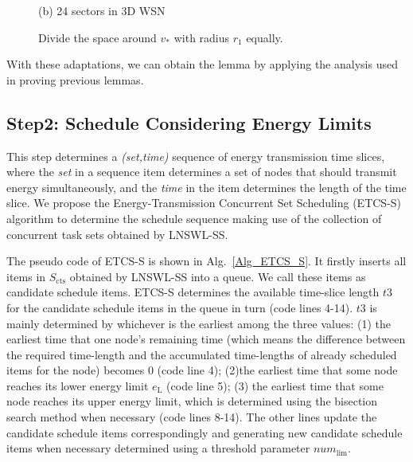 \documentclass[12pt,journal,onecolumn,draftcls]{IEEEtran}
\begin{document}
\begin{IEEEproof}
\begin{figure}[htb]
{\begin{minipage}[c]{0.22\textwidth}
\parbox{\linewidth}{\centering\small{(b) 24 sectors in 3D WSN}}
\end{minipage}
}
\caption{Divide the space around $v_{*}$ with radius $r_1$ equally.}
\label{fig_spacearound_div}
\end{figure}

With these adaptations, we can obtain the lemma by applying the analysis used in proving previous lemmas.
\end{IEEEproof}

\subsection{Step2: Schedule Considering Energy Limits}

This step determines a \textit{(set,time)} sequence of energy transmission time slices, where the \textit{set} in a sequence item determines a set of nodes that should transmit energy simultaneously, and the \textit{time} in the item determines the length of the time slice. We propose the Energy-Transmission Concurrent Set Scheduling (ETCS-S) algorithm to determine the schedule sequence making use of the collection of concurrent task sets obtained by LNSWL-SS.

The pseudo code of ETCS-S is shown in Alg.~\ref{Alg_ETCS_S}. It firstly inserts all items in $S_\text{cts}$ obtained by LNSWL-SS into a queue. We call these items as candidate schedule items. ETCS-S determines the available time-slice length $t3$ for the candidate schedule items in the queue in turn (code lines 4-14). $t3$ is mainly determined by whichever is the earliest among the three values: (1) the earliest time that one node's remaining time (which means the difference between the required time-length and the accumulated time-lengths of already scheduled items for the node) becomes 0 (code line 4); (2)the earliest time that some node reaches its lower energy limit $e_\text{L}$ (code line 5); (3) the earliest time that some node reaches its upper energy limit, which is determined using the bisection search method when necessary (code lines 8-14). The other lines update the candidate schedule items correspondingly and generating new candidate schedule items when necessary determined using a threshold parameter $num_\text{lim}$.
\end{document}
